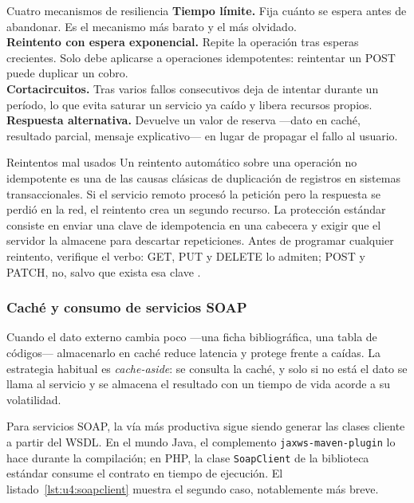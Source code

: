 \documentclass[11pt,a4paper,openany]{book}
\begin{document}
\begin{cajadefinicion}{Cuatro mecanismos de resiliencia}
	\textbf{Tiempo límite.} Fija cuánto se espera antes de abandonar. Es el mecanismo más barato y el más olvidado.\\[3pt]
	\textbf{Reintento con espera exponencial.} Repite la operación tras esperas crecientes. Solo debe aplicarse a operaciones idempotentes: reintentar un POST puede duplicar un cobro.\\[3pt]
	\textbf{Cortacircuitos.} Tras varios fallos consecutivos deja de intentar durante un período, lo que evita saturar un servicio ya caído y libera recursos propios.\\[3pt]
	\textbf{Respuesta alternativa.} Devuelve un valor de reserva ---dato en caché, resultado parcial, mensaje explicativo--- en lugar de propagar el fallo al usuario.
\end{cajadefinicion}

\begin{cajaadvertencia}{Reintentos mal usados}
	Un reintento automático sobre una operación no idempotente es una de las causas clásicas de duplicación de registros en sistemas transaccionales. Si el servicio remoto procesó la petición pero la respuesta se perdió en la red, el reintento crea un segundo recurso. La protección estándar consiste en enviar una clave de idempotencia en una cabecera y exigir que el servidor la almacene para descartar repeticiones. Antes de programar cualquier reintento, verifique el verbo: GET, PUT y DELETE lo admiten; POST y PATCH, no, salvo que exista esa clave \cite{rfc9110}.
\end{cajaadvertencia}

\subsubsection{Caché y consumo de servicios SOAP}

Cuando el dato externo cambia poco ---una ficha bibliográfica, una tabla de códigos--- almacenarlo en caché reduce latencia y protege frente a caídas. La estrategia habitual es \emph{cache-aside}: se consulta la caché, y solo si no está el dato se llama al servicio y se almacena el resultado con un tiempo de vida acorde a su volatilidad.

Para servicios SOAP, la vía más productiva sigue siendo generar las clases cliente a partir del WSDL. En el mundo Java, el complemento \texttt{jaxws-maven-plugin} lo hace durante la compilación; en PHP, la clase \texttt{SoapClient} de la biblioteca estándar consume el contrato en tiempo de ejecución. El listado~\ref{lst:u4:soapclient} muestra el segundo caso, notablemente más breve.
\end{document}

